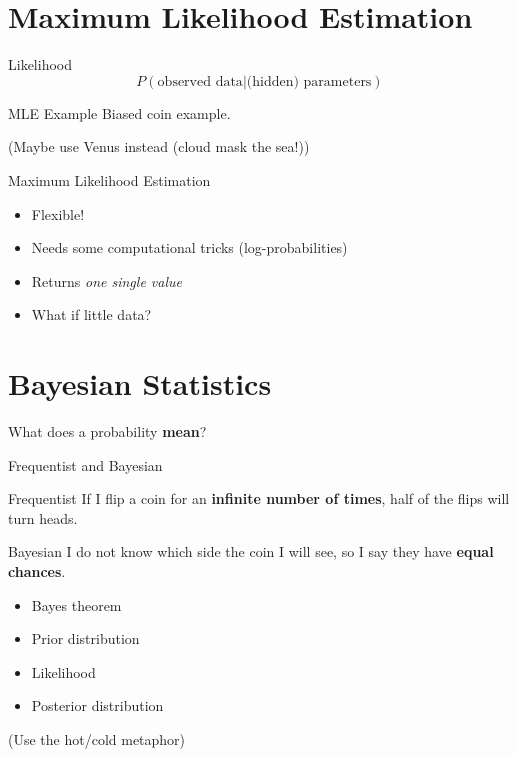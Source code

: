 \documentclass[aspectratio=169,xcolor=svgnames]{beamer}
\begin{document}
\section{Maximum Likelihood Estimation}

\begin{frame}{Likelihood}
  \begin{equation*}
    P(\text{observed data}|\text{(hidden) parameters})
  \end{equation*}
\end{frame}

\begin{frame}{MLE Example}
Biased coin example.

(Maybe use Venus instead (cloud mask the sea!))
\end{frame}

\begin{frame}{Maximum Likelihood Estimation}
  \begin{itemize}
  \item Flexible!
  \item Needs some computational tricks (log-probabilities)
  \item Returns \emph{one single value}
  \item What if little data?
  \end{itemize}
\end{frame}

\section{Bayesian Statistics}

\begin{frame}
  \center
  What does a probability \textbf{mean}?
\end{frame}

\begin{frame}{Frequentist and Bayesian}
  \begin{block}{Frequentist}
    If I flip a coin for an \textbf{infinite number of times},
    half of the flips will turn heads.
  \end{block}

  \begin{block}{Bayesian}
    I do not know which side the coin I will see,
    so I say they have \textbf{equal chances}.
  \end{block}
\end{frame}

\begin{frame}
  \begin{itemize}
  \item Bayes theorem
  \item Prior distribution
  \item Likelihood
  \item Posterior distribution
  \end{itemize}

  (Use the hot/cold metaphor)
\end{frame}
\end{document}

